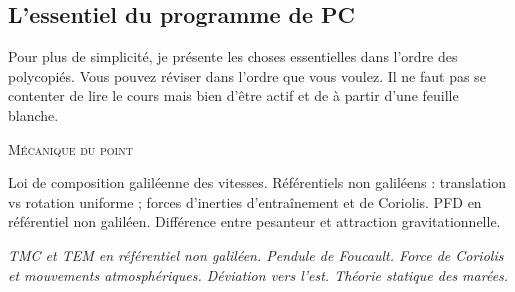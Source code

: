 \documentclass[12pt,fancy]{cours}
\begin{document}
\subsection{L'essentiel du programme de PC}
Pour plus de simplicité, je présente les choses essentielles dans l'ordre des polycopiés. Vous pouvez réviser dans l'ordre que vous voulez. Il ne faut pas se contenter de lire le cours mais bien d'être actif et de  à partir d'une feuille blanche.
\smallskip
\begin{enumerate}
\item \textsc{Mécanique du point}
\item[\Note] Loi de composition galiléenne des vitesses. Référentiels non galiléens : translation vs rotation uniforme ; forces d'inerties d'entraînement et de Coriolis. PFD en référentiel non galiléen. Différence entre pesanteur et attraction gravitationnelle.
{\small
\item[\Nnote] \emph{TMC et TEM en référentiel non galiléen. Pendule de Foucault. Force de Coriolis et mouvements atmosphériques. Déviation vers l'est. Théorie statique des marées.}
}


\end{enumerate}
\end{document}
